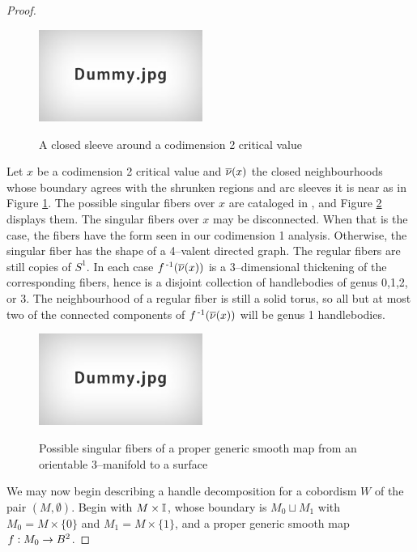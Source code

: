 \begin{proof}
	\begin{figure}
		\centering
		\captionsetup{justification=centering}
		\caption{A closed sleeve around a codimension 2 critical value}
		\includegraphics[height=3cm]{figures/dummy.jpg}
		\label{fig:isolatesleeve}
	\end{figure}
	
	Let $x$ be a codimension 2 critical value and $\overline{\nu}(x)$ the closed neighbourhoods whose boundary agrees with the shrunken regions and arc sleeves it is near as in Figure \ref{fig:isolatesleeve}.
	The possible singular fibers over $x$ are cataloged in \cite{Saeki}, and Figure \ref{fig:saekising} displays them.
	The singular fibers over $x$ may be disconnected.
	When that is the case, the fibers have the form seen in our codimension 1 analysis.
	Otherwise, the singular fiber has the shape of a 4--valent directed graph.
	The regular fibers are still copies of $S^1$.
	In each case $f^{\,\text{-}1}(\overline{\nu}(x))$ is a 3--dimensional thickening of the corresponding fibers, hence is a disjoint collection of handlebodies of genus 0,1,2, or 3.
	The neighbourhood of a regular fiber is still a solid torus, so all but at most two of the connected components of $f^{\,\text{-}1}(\overline{\nu}(x))$ will be genus 1 handlebodies.
	
	\begin{figure}
		\centering
		\captionsetup{justification=centering}
		\caption{Possible singular fibers of a proper generic smooth map from an orientable 3--manifold to a surface}
		\includegraphics[height=3cm]{figures/dummy.jpg}
		\label{fig:saekising}
	\end{figure}
	
	We may now begin describing a handle decomposition for a cobordism $W$ of the pair $(M,\emptyset)$.
	Begin with $M\times\mathbb{I}$, whose boundary is $M_0\sqcup M_1$ with $M_0=M\times\{0\}$ and $M_1 = M\times\{1\}$, and a proper generic smooth map $f:M_0\to B^2$.


\end{proof}
